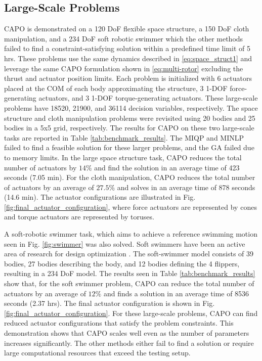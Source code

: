 \subsection{Large-Scale Problems}\label{sec:capo:results:large_scale}
CAPO is demonstrated on a 120 DoF flexible space structure, a 150 DoF cloth manipulation, and a 234 DoF soft robotic swimmer which the other methods failed to find a constraint-satisfying solution within a predefined time limit of 5 hrs. These problems use the same dynamics described in \eqref{eq:space_struct1} and leverage the same CAPO formulation shown in \eqref{eq:multi-rotor} excluding the thrust and actuator position limits. Each problem is initialized with 6 actuators placed at the COM of each body approximating the structure, 3 1-DOF force-generating actuators, and 3 1-DOF torque-generating actuators. These large-scale problems have 18520, 21900, and 36114 decision variables, respectively. The space structure and cloth manipulation problems were revisited using 20 bodies and 25 bodies in a 5x5 grid, respectively. The results for CAPO on these two large-scale tasks are reported in Table \ref{tab:benchmark_results}. The MIQP and MINLP failed to find a feasible solution for these larger problems, and the GA failed due to memory limits. In the large space structure task, CAPO reduces the total number of actuators by $14\%$ and find the solution in an average time of 423 seconds (7.05 min). For the cloth manipulation, CAPO reduces the total number of actuators by an average of $27.5\%$ and solves in an average time of 878 seconds (14.6 min). {The actuator configurations are illustrated in Fig. \ref{fig:final_actuator_configuration}, where force actuators are represented by cones and torque actuators are represented by toruses.}

A soft-robotic swimmer task, which aims to achieve a reference swimming motion seen in Fig. \ref{fig:swimmer} was also solved. Soft swimmers have been an active area of research for design optimization \cite{patel2023highly, nava2022fast, lee2023aquarium}. The soft-swimmer model consists of 39 bodies, 27 bodies describing the body, and 12 bodies defining the 4 flippers, resulting in a 234 DoF model. The results seen in Table \ref{tab:benchmark_results} show that, for the soft swimmer problem, CAPO can reduce the total number of actuators by an average of $12\%$ and finds a solution in an average time of 8536 seconds (2.37 hrs). {The final actuator configuration is shown in Fig. \ref{fig:final_actuator_configuration}.} For these large-scale problems, CAPO can find reduced actuator configurations that satisfy the problem constraints. This demonstration shows that CAPO scales well even as the number of parameters increases significantly. The other methods either fail to find a solution or require large computational resources that exceed the testing setup.
